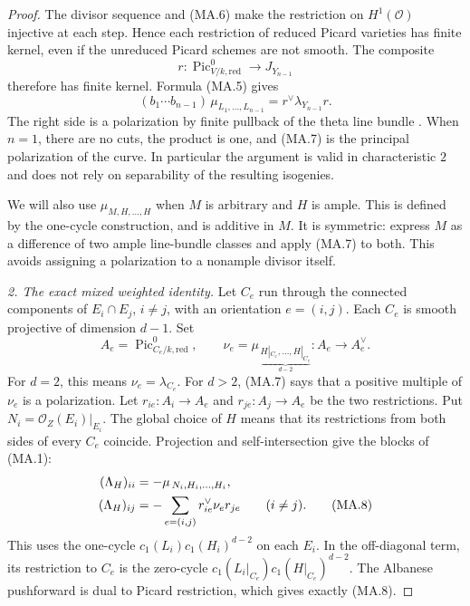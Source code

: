 \begin{proof}
The divisor sequence and (MA.6) make the restriction on
$H^1(\mathcal O)$ injective at each step. Hence each restriction
of reduced Picard varieties has finite kernel, even if the
unreduced Picard schemes are not smooth. The composite
\[
 r:\operatorname{Pic}^0_{V/k,\mathrm{red}}
                       \longrightarrow J_{Y_{n-1}}
\]
therefore has finite kernel. Formula (MA.5) gives
\begin{equation}
 (b_1\cdots b_{n-1})\,
       \mu_{L_1,\ldots,L_{n-1}}=r^\vee\lambda_{Y_{n-1}}r.
                                                        \tag{MA.7}
\end{equation}
The right side is a polarization by finite pullback of the
theta line bundle
\citep[Lemma 30.17.2 and its forward proof]{frC3beStacksFiniteAmple}.
When $n=1$, there are no cuts, the product is one, and (MA.7)
is the principal polarization of the curve.
In particular the argument is valid in characteristic $2$ and
does not rely on separability of the resulting isogenies.

We will also use $\mu_{M,H,\ldots,H}$ when $M$ is arbitrary
and $H$ is ample. This is defined by the one-cycle construction,
and is additive in $M$. It is symmetric: express $M$ as a
difference of two ample line-bundle classes and apply (MA.7)
to both. This avoids assigning a polarization to a nonample
divisor itself.

\emph{2. The exact mixed weighted identity.}
Let $C_e$ run through the connected components of $E_i\cap E_j$,
$i\ne j$, with an orientation $e=(i,j)$.
Each $C_e$ is smooth projective of dimension $d-1$.
Set
\[
 A_e=\operatorname{Pic}^0_{C_e/k,\mathrm{red}},\qquad
 \nu_e=\mu_{\,\underbrace{H|_{C_e},\ldots,H|_{C_e}}_{d-2}}
                            :A_e\longrightarrow A_e^\vee.
\]
For $d=2$, this means $\nu_e=\lambda_{C_e}$.
For $d>2$, (MA.7) says that a positive multiple of $\nu_e$
is a polarization. Let $r_{ie}:A_i\to A_e$ and
$r_{je}:A_j\to A_e$ be the two restrictions. Put
$N_i=\mathcal O_Z(E_i)|_{E_i}$.
The global choice of $H$ means that its restrictions from
both sides of every $C_e$ coincide. Projection and
self-intersection give the blocks of (MA.1):
\begin{align}
 (\Lambda_H)_{ii}
       &=-\mu_{\,N_i,H_i,\ldots,H_i},\notag\\
 (\Lambda_H)_{ij}
       &=-\sum_{e=(i,j)}r_{ie}^\vee\nu_e r_{je}
                                     \qquad(i\ne j).   \tag{MA.8}
\end{align}
This uses the one-cycle
$c_1(L_i)c_1(H_i)^{d-2}$ on each $E_i$.
In the off-diagonal term, its restriction to $C_e$ is the
zero-cycle $c_1(L_i|_{C_e})c_1(H|_{C_e})^{d-2}$.
The Albanese pushforward is dual to Picard restriction,
which gives exactly (MA.8).


\end{proof}

